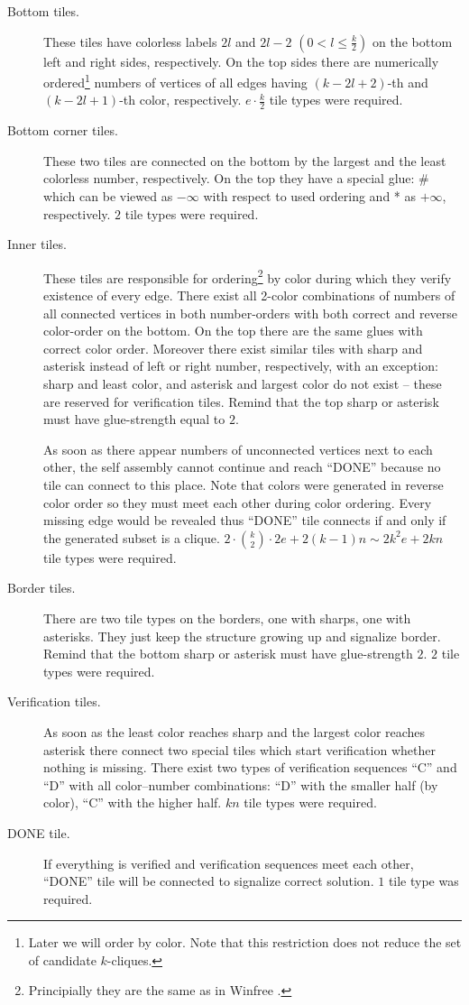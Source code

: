 \begin{description}
	\item[Bottom tiles.] These tiles have colorless labels $2l$ and $2l-2$ $(0 < l \leq \frac{k}{2})$ on the bottom left and right sides, respectively. On the top sides there are numerically ordered\footnote{Later we will order by color. Note that this restriction does not reduce the set of candidate $k$-cliques.} numbers of vertices of all edges having $(k-2l+2)$-th and $(k-2l+1)$-th color, respectively. $e\cdot \frac{k}{2}$ tile types were required.
	\item[Bottom corner tiles.] These two tiles are connected on the bottom by the largest and the least colorless number, respectively. On the top they have a special glue: \# which can be viewed as $-\infty$ with respect to used ordering and * as $+\infty$, respectively. $2$ tile types were required.
	\item[Inner tiles.] These tiles are responsible for ordering\footnote{Principially they are the same as in Winfree \cite{winfree_phd}.} by color during which they verify existence of every edge. There exist all 2-color combinations of numbers of all connected vertices in both number-orders with both correct and reverse color-order on the bottom. On the top there are the same glues with correct color order. Moreover there exist similar tiles with sharp and asterisk instead of left or right number, respectively, with an exception: sharp and least color, and asterisk and largest color do not exist -- these are reserved for verification tiles. Remind that the top sharp or asterisk must have glue-strength equal to $2$.
	
	As soon as there appear numbers of unconnected vertices next to each other, the self assembly cannot continue and reach ``DONE'' because no tile can connect to this place. Note that colors were generated in reverse color order so they must meet each other during color ordering. Every missing edge would be revealed thus ``DONE'' tile connects if and only if the generated subset is a clique. $2\cdot\binom{k}{2}\cdot 2e + 2(k-1)n \sim 2 k^2 e + 2kn$ tile types were required.
	\item[Border tiles.] There are two tile types on the borders, one with sharps, one with asterisks. They just keep the structure growing up and signalize border. Remind that the bottom sharp or asterisk must have glue-strength $2$. $2$ tile types were required.
	\item[Verification tiles.] As soon as the least color reaches sharp and the largest color reaches asterisk there connect two special tiles which start verification whether nothing is missing. There exist two types of verification sequences ``C'' and ``D'' with all color--number combinations: ``D'' with the smaller half (by color), ``C'' with the higher half. $kn$ tile types were required.
	\item[DONE tile.] If everything is verified and verification sequences meet each other, ``DONE'' tile will be connected to signalize correct solution. $1$ tile type was required.
\end{description}

